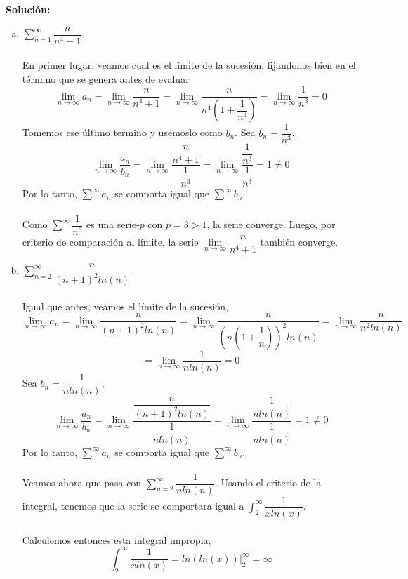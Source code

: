 \documentclass[12pt]{article}
\newenvironment{solucion}
{\begin{mdframed}[backgroundcolor=black!10]
		{\bf Solución:}\\
	}
	{
	\end{mdframed}
}
\newenvironment{preguntas}
{\begin{enumerate}\itemsep12pt
	}
	{
	\end{enumerate}
}
\newcommand{\ev}{\Big|}
\newcommand{\ra}{\rightarrow}
\begin{document}
\begin{preguntas}
\begin{solucion}
\begin{enumerate}[a)]
\item $\sum\limits_{n=1}^{\infty}\dfrac{n}{n^4+1}$\\
			\\
			En primer lugar, veamos cual es el límite de la sucesión, fijandonos bien en el término que se genera antes de evaluar
			$$\lim\limits_{n \ra \infty} a_n
			= \lim\limits_{n \ra \infty} \dfrac{n}{n^4+1}
			= \lim\limits_{n \ra \infty} \dfrac{n}{n^4\left(1+\dfrac{1}{n^4}\right)}
			= \lim\limits_{n \ra \infty} \dfrac{1}{n^3} = 0$$
			Tomemos ese último termino y usemoslo como $b_n$. Sea $b_n = \dfrac{1}{n^3}$,
			$$\lim\limits_{n \ra \infty} \dfrac{a_n}{b_n}
			= \lim\limits_{n \ra \infty} \dfrac{\dfrac{n}{n^4+1}}{\dfrac{1}{n^3}}
			= \lim\limits_{n \ra \infty} \dfrac{\dfrac{1}{n^3}}{\dfrac{1}{n^3}} = 1 \neq 0$$
			Por lo tanto, $\sum\limits^{\infty} a_n$ se comporta igual que $\sum\limits^{\infty} b_n$.\\
			\\
			Como $\sum\limits^{\infty} \dfrac{1}{n^3}$ es una serie-$p$ con $p=3>1$, la serie converge. Luego, por criterio de comparación al límite, la serie $\lim\limits_{n \ra \infty} \dfrac{n}{n^4+1}$ también converge.
\item $\sum\limits_{n=2}^{\infty}\dfrac{n}{(n+1)^2ln(n)}$\\
			\\
			Igual que antes, veamos el límite de la sucesión,
			$$\lim\limits_{n \ra \infty} a_n
			= \lim\limits_{n \ra \infty} \dfrac{n}{(n+1)^2ln(n)}
			= \lim\limits_{n \ra \infty} \dfrac{n}{\left(n\left(1+\dfrac{1}{n}\right)\right)^2ln(n)}
			= \lim\limits_{n \ra \infty} \dfrac{n}{n^2ln(n)}$$
			$$= \lim\limits_{n \ra \infty} \dfrac{1}{nln(n)} = 0$$
			Sea $b_n = \dfrac{1}{nln(n)}$,
			$$\lim\limits_{n \ra \infty} \dfrac{a_n}{b_n}
			=\lim\limits_{n \ra \infty} \dfrac{\dfrac{n}{(n+1)^2ln(n)}}{\dfrac{1}{nln(n)}}
			=\lim\limits_{n \ra \infty} \dfrac{\dfrac{1}{nln(n)}}{\dfrac{1}{nln(n)}} = 1 \neq 0$$
			Por lo tanto, $\sum\limits^{\infty} a_n$ se comporta igual que $\sum\limits^{\infty} b_n$.\\
			\\
			Veamos ahora que pasa con $\sum\limits_{n=2}^{\infty} \dfrac{1}{nln(n)}$. Usando el criterio de la integral, tenemos que la serie se comportara igual a $\displaystyle\int_2^{\infty} \dfrac{1}{xln(x)}$. \\
			\\
			Calculemos entonces esta integral impropia,
			$$\displaystyle\int_2^{\infty} \dfrac{1}{xln(x)} =  ln(ln(x)) \ev_2^{\infty} = \infty$$

\end{enumerate}
\end{solucion}
\end{preguntas}
\end{document}
